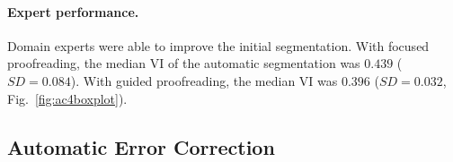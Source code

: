 \begin{table}[t]
\caption{Average proofreading speed for novice users of Dojo, Focused Proofreading (FP) and our Guided Proofreading (GP). Our system achieves significantly higher VI reduction per minute (7.5$\times$) over state-of-the-art FP, while being slightly slower per correction.}%
\label{tab:correctiontimes}
\end{table}

\vspace{-4mm}

\paragraph{Expert performance.} Domain experts were able to improve the initial segmentation. With focused proofreading, the median VI of the automatic segmentation was $0.439$ ($SD=0.084$). With guided proofreading, the median VI was $0.396$ ($SD=0.032$, Fig.~\ref{fig:ac4boxplot}).

\subsection{Automatic Error Correction}

